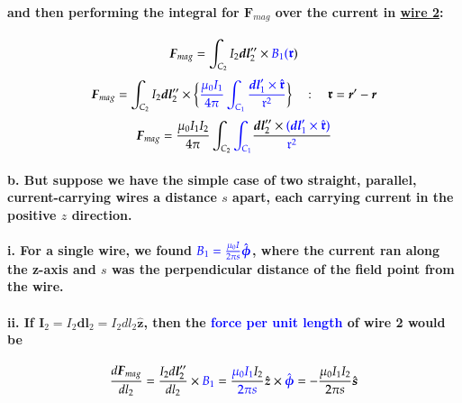 \documentclass{article}
\begin{document}
\paragraph{\indent and then performing the integral for $\boldsymbol{F}_{mag}$ over the current in \underline{wire 2}:}
\begin{equation*}
    \boldsymbol{F}_{mag}=\int_{C_2}I_2\boldsymbol{dl}_2''\times \textcolor{blue}{B_1(\boldsymbol{\mathfrak{r}}})
\end{equation*}
\begin{equation*}
    \boldsymbol{F}_{mag}=\int_{C_2}I_2\boldsymbol{dl}_2''\times \bigg\{ \textcolor{blue}{\frac{\mu_0I_1}{4\pi}\int_{C_1} \frac{\boldsymbol{dl}_1'\times \hat{\boldsymbol{\mathfrak{r}}}}{\mathfrak{r}^2}}\bigg\}\quad:\quad \boldsymbol{\mathfrak{r}}=\boldsymbol{r}'-\boldsymbol{r}
\end{equation*}
\begin{equation*}
    \boldsymbol{F}_{mag}=\frac{\mu_0I_1I_2}{4\pi}\int_{C_2}\textcolor{blue}{\int_{C_1}}\frac{\boldsymbol{dl}_2''\times\textcolor{blue}{(\boldsymbol{dl}_1'\times\hat{\boldsymbol{\mathfrak{r}}})}}{\textcolor{blue}{\mathfrak{r}^2}}
\end{equation*}
\paragraph{\indent b. But suppose we have the simple case of two straight, parallel, current-carrying wires a distance $s$ apart, each carrying current in the positive $z$ direction.}
\paragraph{\indent \indent i. For a single wire, we found $\textcolor{blue}{B_1=\frac{\mu_0I}{2\pi s}\hat{\boldsymbol{\phi}}}$, where the current ran along the z-axis and $s$ was the perpendicular distance of the field point from the wire.}
\paragraph{\indent \indent ii. If $\boldsymbol{I}_2=I_2\boldsymbol{dl}_2=I_2dl_2\hat{\boldsymbol{z}}$, then the \textcolor{blue}{force per unit length} of wire 2 would be}
\begin{equation*}
    \frac{d\boldsymbol{F}_{mag}}{dl_2}=\frac{I_2d\boldsymbol{l}_2''}{dl_2}\times \textcolor{blue}{B_1}=\frac{\textcolor{blue}{\mu_0I_1}I_2}{\textcolor{blue}{2\pi s}}\hat{\boldsymbol{z}}\times \textcolor{blue}{\hat{\boldsymbol{\phi}}}=-\frac{\mu_0I_1I_2}{2\pi s}\hat{\boldsymbol{s}}
\end{equation*}
\end{document}

